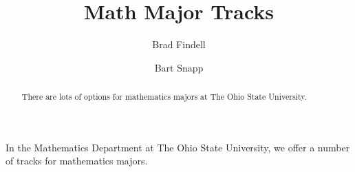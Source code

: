 \documentclass[handout,nooutcomes,space]{ximera}
\title{Math Major Tracks}
\author{Brad Findell \and Bart Snapp}
\begin{document}
\begin{abstract}
There are lots of options for mathematics majors at The Ohio State University. 
\end{abstract}
\maketitle

In the Mathematics Department at The Ohio State University, we offer a
number of tracks for mathematics majors.

% 
% 
% 
% 
\end{document}
